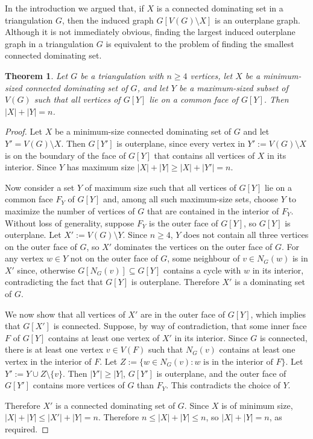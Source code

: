 \documentclass[11pt]{article}
\newtheorem{thm}{Theorem}
\theoremstyle{definition}
\begin{document}
In the introduction we argued that, if $X$ is a connected dominating set in a triangulation $G$, then the induced graph $G[V(G)\setminus X]$ is an outerplane graph.  Although it is not immediately obvious, finding the largest induced outerplane graph in a triangulation $G$ is equivalent to the problem of finding the smallest connected dominating set.

\begin{thm}
  Let $G$ be a triangulation with $n\ge 4$ vertices, let $X$ be a minimum-sized connected dominating set of $G$, and let $Y$ be a maximum-sized subset of $V(G)$ such that all vertices of $G[Y]$ lie on a common face of $G[Y]$. Then $|X|+|Y|=n$.
\end{thm}

\begin{proof}
  Let $X$ be a minimum-size connected dominating set of $G$ and let $Y'=V(G)\setminus X$.  Then $G[Y']$ is outerplane, since every vertex in $Y':=V(G)\setminus X$ is on the boundary of the face of $G[Y]$ that contains all vertices of $X$ in its interior.  Since $Y$ has maximum size $|X|+|Y|\ge |X|+|Y'|= n$.

  Now consider a set $Y$ of maximum size such that all vertices of $G[Y]$ lie on a common face $F_Y$ of $G[Y]$ and, among all such maximum-size sets, choose $Y$ to maximize the number of vertices of $G$ that are contained in the interior of $F_Y$.  Without loss of generality, suppose $F_Y$ is the outer face of $G[Y]$, so $G[Y]$ is outerplane.  Let $X':=V(G)\setminus Y$. Since $n\ge 4$, $Y$ does not contain all three vertices on the outer face of $G$, so $X'$ dominates the vertices on the outer face of $G$. For any vertex $w\in Y$ not on the outer face of $G$, some neighbour of $v\in N_G(w)$ is in $X'$ since, otherwise $G[N_G(v)]\subseteq G[Y]$ contains a cycle with $w$ in its interior, contradicting the fact that $G[Y]$ is outerplane. Therefore $X'$ is a dominating set of $G$.

  We now show that all vertices of $X'$ are in the outer face of $G[Y]$, which implies that $G[X']$ is connected.  Suppose, by way of contradiction, that some inner face $F$ of $G[Y]$ contains at least one vertex of $X'$ in its interior.  Since $G$ is connected, there is at least one vertex $v\in V(F)$ such that $N_G(v)$ contains at least one vertex in the interior of $F$.  Let $Z:=\{w\in N_G(v):\text{$w$ is in the interior of $F$}\}$. Let $Y':=Y\cup Z \setminus\{v\}$.  Then $|Y'|\ge |Y|$, $G[Y']$ is outerplane, and the outer face of $G[Y']$ contains more vertices of $G$ than  $F_Y$. This contradicts the choice of $Y$.

  Therefore $X'$ is a connected dominating set of $G$.  Since $X$ is of minimum size, $|X|+|Y|\le |X'|+|Y|=n$.  Therefore $n\le |X|+|Y|\le n$, so $|X|+|Y|=n$, as required.
\end{proof}
\end{document}
